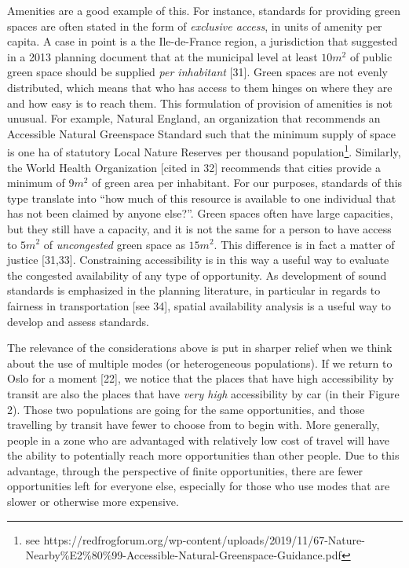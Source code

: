 \documentclass[10pt,letterpaper]{article}
\begin{document}
Amenities are a good example of this. For instance, standards for
providing green spaces are often stated in the form of \emph{exclusive
access}, in units of amenity per capita. A case in point is a the
Ile-de-France region, a jurisdiction that suggested in a 2013 planning
document that at the municipal level at least \(10m^2\) of public green
space should be supplied \emph{per inhabitant} {[}31{]}. Green spaces
are not evenly distributed, which means that who has access to them
hinges on where they are and how easy is to reach them. This formulation
of provision of amenities is not unusual. For example, Natural England,
an organization that recommends an Accessible Natural Greenspace
Standard such that the minimum supply of space is one ha of statutory
Local Nature Reserves per thousand population\footnote{see
  https://redfrogforum.org/wp-content/uploads/2019/11/67-Nature-Nearby\%E2\%80\%99-Accessible-Natural-Greenspace-Guidance.pdf}.
Similarly, the World Health Organization {[}cited in 32{]} recommends
that cities provide a minimum of 9\(m^2\) of green area per inhabitant.
For our purposes, standards of this type translate into ``how much of
this resource is available to one individual that has not been claimed
by anyone else?''. Green spaces often have large capacities, but they
still have a capacity, and it is not the same for a person to have
access to \(5m^2\) of \emph{uncongested} green space as \(15m^2\). This
difference is in fact a matter of justice {[}31,33{]}. Constraining
accessibility is in this way a useful way to evaluate the congested
availability of any type of opportunity. As development of sound
standards is emphasized in the planning literature, in particular in
regards to fairness in transportation {[}see 34{]}, spatial availability
analysis is a useful way to develop and assess standards.

The relevance of the considerations above is put in sharper relief when
we think about the use of multiple modes (or heterogeneous populations).
If we return to Oslo for a moment {[}22{]}, we notice that the places
that have high accessibility by transit are also the places that have
\emph{very high} accessibility by car (in their Figure 2). Those two
populations are going for the same opportunities, and those travelling
by transit have fewer to choose from to begin with. More generally,
people in a zone who are advantaged with relatively low cost of travel
will have the ability to potentially reach more opportunities than other
people. Due to this advantage, through the perspective of finite
opportunities, there are fewer opportunities left for everyone else,
especially for those who use modes that are slower or otherwise more
expensive.
\end{document}
